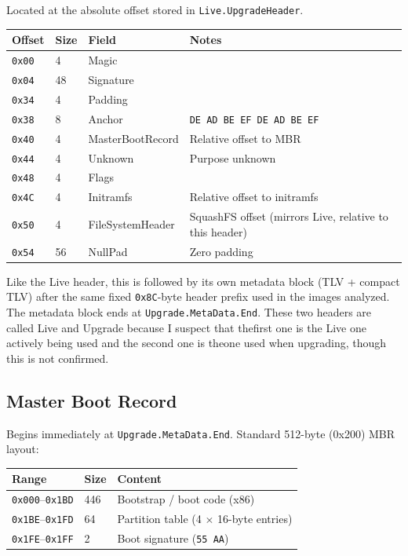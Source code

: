 \documentclass[11pt,a4paper]{article}
\begin{document}
Located at the absolute offset stored in \texttt{Live.UpgradeHeader}.

\begin{center}
\begin{tabular}{llll}
\toprule
\textbf{Offset} & \textbf{Size} & \textbf{Field} & \textbf{Notes} \\
\midrule
\texttt{0x00} & 4  & Magic            & \\
\texttt{0x04} & 48 & Signature        & \\
\texttt{0x34} & 4  & Padding          & \\
\texttt{0x38} & 8  & Anchor           & \texttt{DE AD BE EF DE AD BE EF} \\
\texttt{0x40} & 4  & MasterBootRecord & Relative offset to MBR \\
\texttt{0x44} & 4  & Unknown          & Purpose unknown \\
\texttt{0x48} & 4  & Flags            & \\
\texttt{0x4C} & 4  & Initramfs        & Relative offset to initramfs \\
\texttt{0x50} & 4  & FileSystemHeader & SquashFS offset (mirrors Live, relative to this header) \\
\texttt{0x54} & 56 & NullPad          & Zero padding \\
\bottomrule
\end{tabular}
\end{center}

Like the Live header, this is followed by its own metadata block
(TLV + compact TLV) after the same fixed \texttt{0x8C}-byte header
prefix used in the images analyzed. The metadata block ends at
\texttt{Upgrade.MetaData.End}. These two headers are called Live 
and Upgrade because I suspect that thefirst one is the Live one 
actively being used and the second one is theone used when upgrading, 
though this is not confirmed.

\subsection{Master Boot Record}

Begins immediately at \texttt{Upgrade.MetaData.End}. Standard 512-byte (0x200)
MBR layout:

\begin{center}
\begin{tabular}{lll}
\toprule
\textbf{Range} & \textbf{Size} & \textbf{Content} \\
\midrule
\texttt{0x000}--\texttt{0x1BD} & 446 & Bootstrap / boot code (x86) \\
\texttt{0x1BE}--\texttt{0x1FD} & 64  & Partition table (4 \(\times\) 16-byte entries) \\
\texttt{0x1FE}--\texttt{0x1FF} & 2   & Boot signature (\texttt{55 AA}) \\
\bottomrule
\end{tabular}
\end{center}
\end{document}
